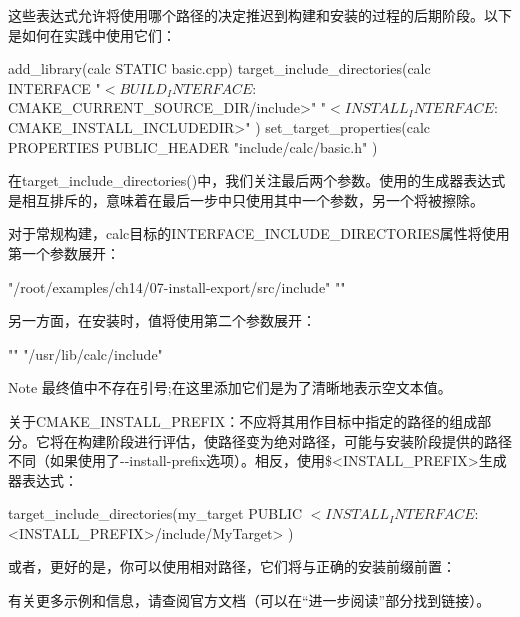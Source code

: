 这些表达式允许将使用哪个路径的决定推迟到构建和安装的过程的后期阶段。以下是如何在实践中使用它们：


\begin{cmake}
add_library(calc STATIC basic.cpp)
target_include_directories(calc INTERFACE
    "$<BUILD_INTERFACE:${CMAKE_CURRENT_SOURCE_DIR}/include>"
    "$<INSTALL_INTERFACE:${CMAKE_INSTALL_INCLUDEDIR}>"
)
set_target_properties(calc PROPERTIES
    PUBLIC_HEADER "include/calc/basic.h"
)
\end{cmake}

在target\_include\_directories()中，我们关注最后两个参数。使用的生成器表达式是相互排斥的，意味着在最后一步中只使用其中一个参数，另一个将被擦除。

对于常规构建，calc目标的INTERFACE\_INCLUDE\_DIRECTORIES属性将使用第一个参数展开：

\begin{cmake}
"/root/examples/ch14/07-install-export/src/include" ""
\end{cmake}

另一方面，在安装时，值将使用第二个参数展开：

\begin{cmake}
"" "/usr/lib/calc/include"
\end{cmake}

\begin{myNotic}{Note}
最终值中不存在引号;在这里添加它们是为了清晰地表示空文本值。
\end{myNotic}

关于CMAKE\_INSTALL\_PREFIX：不应将其用作目标中指定的路径的组成部分。它将在构建阶段进行评估，使路径变为绝对路径，可能与安装阶段提供的路径不同（如果使用了-{}-install-prefix选项）。相反，使用\$<INSTALL\_PREFIX>生成器表达式：

\begin{cmake}
target_include_directories(my_target PUBLIC
    $<INSTALL_INTERFACE:$<INSTALL_PREFIX>/include/MyTarget>
)
\end{cmake}

或者，更好的是，你可以使用相对路径，它们将与正确的安装前缀前置：


有关更多示例和信息，请查阅官方文档（可以在“进一步阅读”部分找到链接）。


